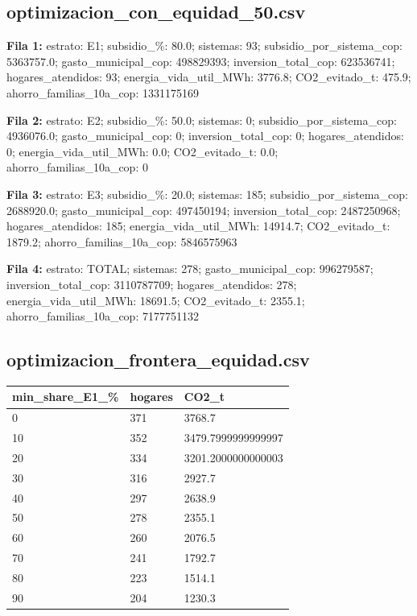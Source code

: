 \subsection*{optimizacion\_con\_equidad\_50.csv}
{\footnotesize\textbf{Fila 1:} estrato: E1; subsidio\_\%: 80.0; sistemas: 93; subsidio\_por\_sistema\_cop: 5363757.0; gasto\_municipal\_cop: 498829393; inversion\_total\_cop: 623536741; hogares\_atendidos: 93; energia\_vida\_util\_MWh: 3776.8; CO2\_evitado\_t: 475.9; ahorro\_familias\_10a\_cop: 1331175169\par}
{\footnotesize\textbf{Fila 2:} estrato: E2; subsidio\_\%: 50.0; sistemas: 0; subsidio\_por\_sistema\_cop: 4936076.0; gasto\_municipal\_cop: 0; inversion\_total\_cop: 0; hogares\_atendidos: 0; energia\_vida\_util\_MWh: 0.0; CO2\_evitado\_t: 0.0; ahorro\_familias\_10a\_cop: 0\par}
{\footnotesize\textbf{Fila 3:} estrato: E3; subsidio\_\%: 20.0; sistemas: 185; subsidio\_por\_sistema\_cop: 2688920.0; gasto\_municipal\_cop: 497450194; inversion\_total\_cop: 2487250968; hogares\_atendidos: 185; energia\_vida\_util\_MWh: 14914.7; CO2\_evitado\_t: 1879.2; ahorro\_familias\_10a\_cop: 5846575963\par}
{\footnotesize\textbf{Fila 4:} estrato: TOTAL; sistemas: 278; gasto\_municipal\_cop: 996279587; inversion\_total\_cop: 3110787709; hogares\_atendidos: 278; energia\_vida\_util\_MWh: 18691.5; CO2\_evitado\_t: 2355.1; ahorro\_familias\_10a\_cop: 7177751132\par}
\subsection*{optimizacion\_frontera\_equidad.csv}
{\footnotesize\begin{longtable}{@{}lll@{}}
\toprule
min\_share\_E1\_\% & hogares & CO2\_t \\
\midrule\endhead
0 & 371 & 3768.7 \\
10 & 352 & 3479.7999999999997 \\
20 & 334 & 3201.2000000000003 \\
30 & 316 & 2927.7 \\
40 & 297 & 2638.9 \\
50 & 278 & 2355.1 \\
60 & 260 & 2076.5 \\
70 & 241 & 1792.7 \\
80 & 223 & 1514.1 \\
90 & 204 & 1230.3 \\
\bottomrule
\end{longtable}}

